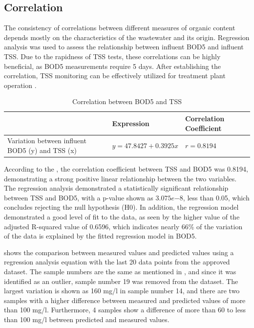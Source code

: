 

\subsection{Correlation}
The consistency of correlations between different measures of organic content depends mostly on the characteristics of the wastewater and its origin. Regression analysis was used to assess the relationship between influent \ac{BOD5} and influent \ac{TSS}. Due to the rapidness of \ac{TSS} tests, these correlations can be highly beneficial, as \ac{BOD5} measurements require 5 days. After establishing the correlation, \ac{TSS} monitoring can be effectively utilized for treatment plant operation \cite{Kumar2010}.

\begin{table}[H]
    \centering
    
\caption{Correlation between \ac{BOD5} and \ac{TSS}}
\label{tab:BOD_TSS_correlations}
    \begin{tabular}{|>{\raggedright\arraybackslash}p{5cm}|>{\centering\arraybackslash}p{5cm}|>{\centering\arraybackslash}p{4.5cm}|}
    \hline
          & Expression & Correlation Coefficient \\
          \hline
         Variation between influent \ac{BOD5} (y) and \ac{TSS} (x) & $y = 47.8427 + 0.3925x$  & $ r = 0.8194$ \\
         \hline
    \end{tabular}
\end{table}


According to the , the correlation coefficient between \ac{TSS} and \ac{BOD5} was 0.8194, demonstrating a strong positive linear relationship between the two variables. The regression analysis demonstrated a statistically significant relationship between \ac{TSS} and \ac{BOD5}, with a p-value shown as $3.075 e{-8}$, less than 0.05, which concludes rejecting the null hypothesis (H0). In addition, the regression model demonstrated a good level of fit to the data, as seen by the higher value of the adjusted R-squared value of 0.6596, which indicates nearly 66\% of the variation of the data is explained by the fitted regression model in \ac{BOD5}. 



 shows the comparison between measured values and predicted values using a regression analysis equation with the last 20 data points from the approved dataset. The sample numbers are the same as mentioned in , and since it was identified as an outlier, sample number 19 was removed from the dataset. The largest variation is shown as 160 mg/l in sample number 14, and there are two samples with a higher difference between measured and predicted values of more than 100 mg/l. Furthermore, 4 samples show a difference of more than 60 to less than 100 mg/l between predicted and measured values. 



